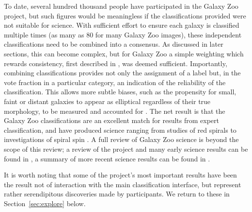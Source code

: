 \documentclass{ar2e}
\def\Sref#1{Section~\ref{#1}\xspace}
\begin{document}

To date, several hundred thousand people 
have participated in the Galaxy Zoo project, but such
figures would be meaningless if the classifications provided were not suitable
for science. With sufficient effort to ensure each galaxy is classified multiple
times (as many as 80 for many Galaxy Zoo images), these independent
classifications need to be combined into a consensus. As discussed in later
sections, this can become complex, but for Galaxy Zoo a simple weighting which
rewards consistency, first described in \citet{Land++2008}, was deemed sufficient.
Importantly, combining classifications provides not only the assignment of a
label but, in the vote fraction in a particular category, an indication of the
reliability of the classification. This allows more subtle biases, such as the
propensity for small, faint or distant galaxies to appear as elliptical
regardless of their true morphology, to be measured and accounted for
\citep[see][]{Bamford++2009}. The net result is that the Galaxy Zoo classifications
are an excellent match for results from expert classification, and have produced
science ranging from studies of red spirals \citep{Masters++2010} to investigations
of spiral spin \citep{Slosar++2009}.
A full review of Galaxy Zoo science is beyond the scope of this review; a review
of the project and many early science results can be found in
\citet{Fortson++2012}, a summary of more recent science results can be found in
\citet{Willett++2013}.


It is worth noting that some of the project's most important results
have been the result not of interaction with the main classification interface,
but represent rather serendipitous discoveries made by participants. 
We return to these in \Sref{sec:explore} below.



\end{document}
